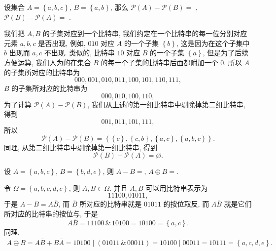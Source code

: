 \documentclass[10pt,UTF8]{book} %
\begin{document}
\begin{exercise}
    设集合 $A = \left\{ a,b,c \right\}$, $B = \left\{a,b\right\}$,
    那么 $\mathcal{P}(A) - \mathcal{P}(B) =$ \underline{\qquad \qquad \qquad},
    $\mathcal{P}(B) - \mathcal{P}(A) = $ \underline{\qquad \qquad \qquad}.
    \begin{cmt}
        我们把 $A, B$ 的子集对应到一个比特串, 我们约定在一个比特串的每一位分别对应元素 $a,b,c$
        是否出现, 例如, $010$ 对应 $A$ 的一个子集 $\left\{ b \right\}$,
        这是因为在这个子集中 $b$ 出现而 $a,c$ 不出现.
        类似的, 比特串 $10$ 对应 $B$ 的一个子集 $\left\{a\right\}$,
        但是为了后续方便运算, 我们人为的在集合 $B$ 的每一个子集的比特串后面都附加一个 $0$.
        所以 $A$ 的子集所对应的比特串为
        \[ 000, 001, 010, 011, 100, 101, 110, 111, \]
        $B$ 的子集所对应的比特串为
        \[ 000, 010, 100, 110, \]
        为了计算 $\mathcal{P}(A) - \mathcal{P}(B)$,
        我们从上述的第一组比特串中剔除掉第二组比特串, 得到
        \[ 001, 011, 101, 111, \]
        所以 \[ \mathcal{P}(A) - \mathcal{P}(B)
        = \left\{
            \left\{c\right\}, \left\{c,b\right\},
            \left\{a,c\right\}, \left\{a,b,c\right\}
        \right\}. \]
        同理, 从第二组比特串中剔除掉第一组比特串, 得到
        \[ \mathcal{P}(B) - \mathcal{P}(A) = \varnothing. \]
    \end{cmt}
\end{exercise}

\begin{exercise}
    设 $A = \left\{ a,b,c \right\}$, $B = \left\{ b,d,e \right\}$,
    则 $A - B = $\underline{\qquad \qquad \qquad},
    $A \oplus B =$\underline{\qquad \qquad \qquad}.
    \begin{cmt}
        令 $\varOmega = \left\{ a,b,c,d,e \right\}$,
        则 $A, B \in \varOmega$. 并且 $A, B$ 可以用比特串表示为
        \[ 11100, 01011, \]
        于是 $A - B = A \bar B$, 而 $\bar B$ 所对应的比特串就是 $01011$ 的按位取反,
        而 $A\bar B$ 就是它们所对应的比特串的按位与,
        于是 \[ A \bar B = 11100 \,\&\, 10100 = 10100 = \left\{ a,c \right\}. \]
        同理,
        \[ \begin{aligned}
            A \oplus B = A\bar B + B \bar A
            = 10100 \mid (01011 \,\&\, 00011)
            = 10100 \mid 00011
            = 10111 = \left\{ a,c,d,e \right\}.
        \end{aligned} \]
    \end{cmt}
\end{exercise}
\end{document}
